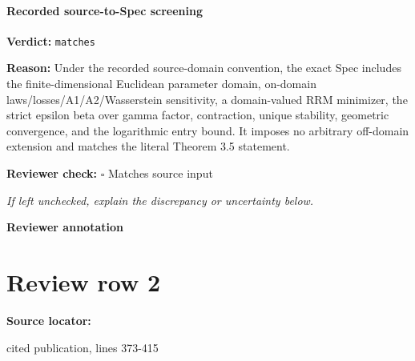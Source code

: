 \documentclass[10pt]{article}
\newcommand{\reviewerbox}{%
  \par\noindent\fbox{\parbox{0.96\linewidth}{\rule{0pt}{0.38in}}}\par
}
\newcommand{\reviewmatch}[1]{%
  \par\noindent\textbf{Reviewer check:} $\square$\; #1\par
  \noindent\emph{If left unchecked, explain the discrepancy or uncertainty below.}\par
}
\begin{document}
\paragraph{Recorded source-to-Spec screening}
\textbf{Verdict:} \texttt{matches}
\\
{\raggedright
\textbf{Reason:} Under the recorded source-\allowbreak{}domain convention, the exact Spec includes the finite-\allowbreak{}dimensional Euclidean parameter domain, on-\allowbreak{}domain laws/\allowbreak{}losses/\allowbreak{}A1/\allowbreak{}A2/\allowbreak{}Wasserstein sensitivity, a domain-\allowbreak{}valued RRM minimizer, the strict epsilon beta over gamma factor, contraction, unique stability, geometric convergence, and the logarithmic entry bound.\allowbreak{} It imposes no arbitrary off-\allowbreak{}domain extension and matches the literal Theorem 3.\allowbreak{}5 statement.\allowbreak{}
\par}
\reviewmatch{Matches source input}
\noindent\textbf{Reviewer annotation}\par
\reviewerbox
\clearpage
\hypertarget{source-claim-d10117a376c0a20b}{}
\section*{Review row 2}
\textbf{Source locator:} {\footnotesize\raggedright cited publication, lines 373-\allowbreak{}415\par}
\end{document}
